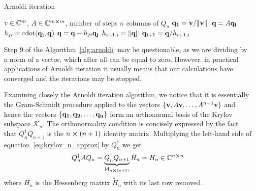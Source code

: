 \begin{algorithm}
	\algrenewcommand{}
	\algrenewcommand{}
	\caption{Arnoldi iteration}
	\label{alg:arnoldi}
	\begin{algorithmic}[1]
		\Require \(v \in \mathbb{C}^m\), \(A \in \mathbb{C}^{m\cross m}\), number of steps \(n\)
		\Ensure columns of \(Q_n\)
		\State \(\vectorbold{q_1} = \vectorbold{v}/\norm*{\vectorbold{v}}\)
			\State \(\vectorbold{q} = A\vectorbold{q_i}\)
				\State \(h_{ji} = \mathrm{cdot}(\vectorbold{q_j},\vectorbold{q})\) 
				\State \(\vectorbold{q} = \vectorbold{q} - h_{ji}\vectorbold{q_j}\) 
			\EndFor
			\State \(h_{i+1,i} = \norm{\vectorbold{q}} \) 
			\State \(\vectorbold{q_{i+1}} = \vectorbold{q}/h_{i+1,i} \)
		\EndFor
	\end{algorithmic}
\end{algorithm}
Step 9 of the Algorithm~\ref{alg:arnoldi} may be questionable, as we are dividing by a norm of a vector, which
after all can be equal to zero. However, in practical applications of Arnoldi iteration it usually means
that our calculations have converged and the iterations may be stopped.


Examining closely the Arnoldi iteration algorithm, we notice that it is essentially the Gram-Schmidt
procedure applied to the vectors \(\{\vectorbold{v}, A\vectorbold{v},\ldots, A^{n-1}\vectorbold{v}\}\) and hence the 
vectors \(\{\vectorbold{q_1}, \vectorbold{q_2},\ldots,\vectorbold{q_n}\}\) form an orthonormal basis
of the Krylov subspace \(\mathcal{K}_n\). The orthonormality condition is concisely expressed by 
the fact that \(Q^{\dagger}_n Q_{n+1} \) is the \(n\cross (n+1)\) identity matrix. Multiplying the left-hand side of
equation~\eqref{eq:krylov_n_approx} by \(Q^{\dagger}_n\) we get
\begin{equation}
	Q^{\dagger}_n A Q_n = \underbrace{Q^{\dagger}_n Q_{n+1}}_{\mathrm{Id}_{n\cross(n+1)}}\tilde{H}_n = H_n \in \mathbb{C}^{n\cross n}
\end{equation}
where \(H_n\) is the Hessenberg matrix \(\tilde{H}_n\) with its last row removed. 

